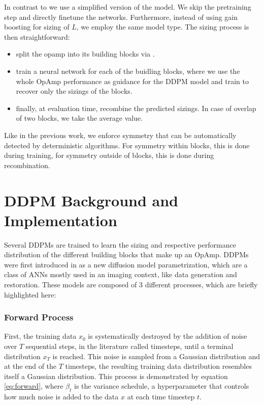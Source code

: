 \documentclass[conference]{IEEEtran}
\begin{document}
	In contrast to \cite{ leibl24inverse} we use a simplified version of the model. We skip the pretraining step and directly finetune the networks. Furthermore, instead of using gain boosting for sizing of $L$, we employ the same model type.
	The sizing process is then straightforward:
	\begin{itemize}
	\item split the opamp into its building blocks via \cite{abel2022fuboco}.
	\item train a neural network for each of the buidling blocks, where we use the whole OpAmp performance as guidance for the DDPM model and train to recover only the sizings of the blocks.
	\item finally, at evaluation time, recombine the predicted sizings. In case of overlap of two blocks, we take the average value.
	\end{itemize}

	Like in the previous work, we enforce symmetry that can be automatically detected by deterministic algorithms. For symmetry within blocks, this is done during training, for symmetry outside of blocks, this is done during recombination.
			

	
\section{DDPM Background and Implementation}\label{sec:ddpm}
	Several DDPMs are trained to learn the sizing and respective performance distribution of the different building blocks that make up an OpAmp. DDPMs were first introduced in \cite{ho2020denoisingdiffusionprobabilisticmodels} as a new diffusion model parametrization, which are a class of ANNs mostly used in an imaging context, like data generation and restoration. These models are composed of 3 different processes, which are briefly highlighted here:
	
	\subsubsection{Forward Process}
	First, the training data $x_{0}$ is systematically destroyed by the addition of noise over $T$ sequential steps, in the literature called timesteps, until a terminal distribution $x_{T}$ is reached. This noise is sampled from a Gaussian distribution and at the end of the $T$ timesteps, the resulting training data distribution resembles itself a Gaussian distribution. %
	This process is demonstrated by equation \ref{eq:forward}, where $\beta_{t}$ is the variance schedule, a hyperparameter that controls how much noise is added to the data $x$ at each time timestep $t$.
	
\end{document}
